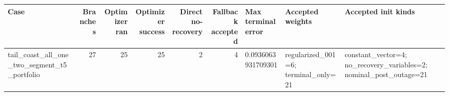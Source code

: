 \begin{tabular}{lrrrrrlll}
\toprule
Case & Branches & Optimizer ran & Optimizer success & Direct no-recovery & Fallback accepted & Max terminal error & Accepted weights & Accepted init kinds \\
\midrule
tail\_coast\_all\_one\_two\_segment\_t5\_portfolio & 27 & 25 & 25 & 2 & 4 & 0.0936063931709301 & regularized\_001=6; terminal\_only=21 & constant\_vector=4; no\_recovery\_variables=2; nominal\_post\_outage=21 \\
\bottomrule
\end{tabular}
